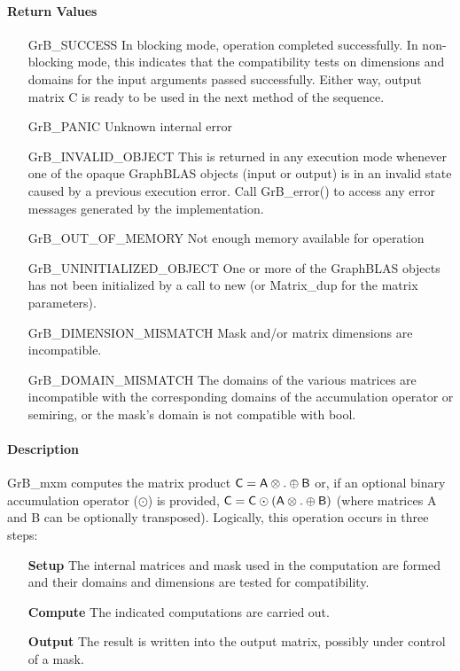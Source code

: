 \paragraph{Return Values}

\begin{itemize}[leftmargin=2.1in]
	\item[{\sf GrB\_SUCCESS}]	      In blocking mode, operation
	completed successfully. In non-blocking mode, this indicates
	that the compatibility tests on dimensions and domains for the
	input arguments passed successfully. Either way, output matrix
	{\sf C} is ready to be used in the next method of the sequence.

	\item[{\sf GrB\_PANIC}]		      Unknown internal error

    \item[{\sf GrB\_INVALID\_OBJECT}] This is returned in any execution mode 
    whenever one of the opaque GraphBLAS objects (input or output) is in an invalid 
    state caused by a previous execution error.  Call {\sf GrB\_error()} to access 
    any error messages generated by the implementation.

	\item[{\sf GrB\_OUT\_OF\_MEMORY}]	      Not enough memory available
	for operation
    
    \item[{\sf GrB\_UNINITIALIZED\_OBJECT}]  One or more of the GraphBLAS 
    objects has not been initialized by a call to {\sf new} (or 
    {\sf Matrix\_dup} for the matrix parameters).
    
	\item[{\sf GrB\_DIMENSION\_MISMATCH}] Mask and/or matrix dimensions are
	incompatible.

    \item[{\sf GrB\_DOMAIN\_MISMATCH}]    The domains of the various
    matrices are incompatible with the corresponding domains of the
    accumulation operator or semiring, or the mask's domain is not compatible 
    with {\sf bool}.
\end{itemize}

\paragraph{Description}

{\sf GrB\_mxm} computes the matrix product ${\sf C} = {\sf
A} \otimes . \oplus {\sf B}$ or, if an optional binary accumulation
operator ($\odot$) is provided, ${\sf C} = {\sf C} \odot
\left({\sf A} \otimes . \oplus {\sf B}\right)$ (where matrices {\sf A}
and {\sf B} can be optionally transposed).  Logically, this operation
occurs in three steps:
\begin{enumerate}[leftmargin=0.75in]
\item[\bf Setup] The internal matrices and mask used in the computation are formed and their 
domains and dimensions are tested for compatibility.
\item[\bf Compute] The indicated computations are carried out.
\item[\bf Output] The result is written into the output matrix, possibly under control of a mask.
\end{enumerate}

